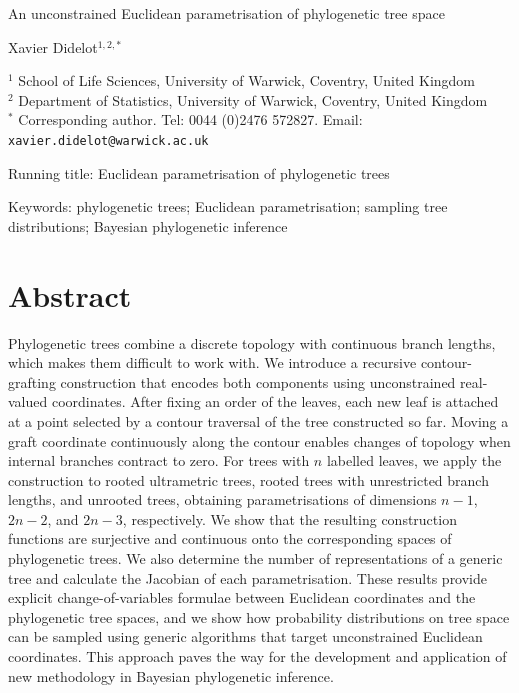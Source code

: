 \documentclass{article}
\begin{document}
{\Large An unconstrained Euclidean parametrisation of phylogenetic tree space}

\vspace*{2cm}
Xavier Didelot$^{1,2,*}$

\vspace*{2cm}
$^\mathrm{1}$ School of Life Sciences, University of Warwick, Coventry, United Kingdom\\
$^\mathrm{2}$ Department of Statistics, University of Warwick, Coventry, United Kingdom\\
$^*$ Corresponding author. Tel: 0044 (0)2476 572827. Email: \verb+xavier.didelot@warwick.ac.uk+

\vspace*{2cm}
Running title: Euclidean parametrisation of phylogenetic trees

\vspace*{2cm}
Keywords: phylogenetic trees; Euclidean parametrisation; 
sampling tree distributions; Bayesian phylogenetic inference

\newpage
\section*{Abstract}
Phylogenetic trees combine a discrete topology with continuous branch lengths, which makes them difficult to work with. We introduce a recursive contour-grafting construction that encodes both components using unconstrained real-valued coordinates. After fixing an order of the leaves, each new leaf is attached at a point selected by a contour traversal of the tree constructed so far. Moving a graft coordinate continuously along the contour enables changes of topology when internal branches contract to zero. For trees with $n$ labelled leaves, we apply the construction to rooted ultrametric trees, rooted trees with unrestricted branch lengths, and unrooted trees, obtaining parametrisations of dimensions $n-1$, $2n-2$, and $2n-3$, respectively. We show that the resulting construction functions are surjective and continuous onto the corresponding spaces of phylogenetic trees. We also determine the number of representations of a generic tree and calculate the Jacobian of each parametrisation. These results provide explicit change-of-variables formulae between Euclidean coordinates and the phylogenetic tree spaces, and we show how probability distributions on tree space can be sampled using generic algorithms that target unconstrained Euclidean coordinates. This approach paves the way for the development and application of new methodology in Bayesian phylogenetic inference.
\end{document}
